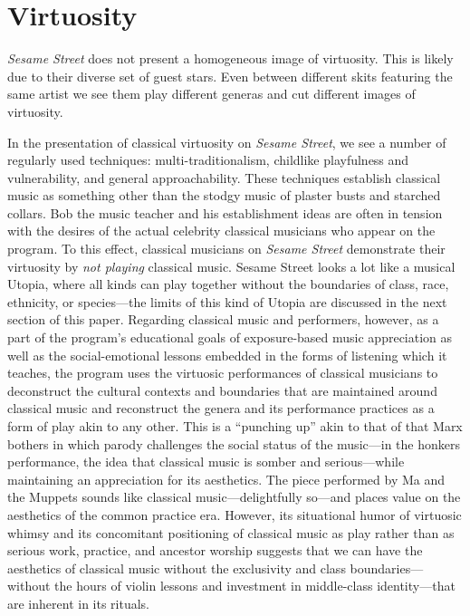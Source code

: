 \documentclass[12pt,letterpaper]{article}
\newcommand{\ses}{\textit{Sesame Street }}
\begin{document}
	\section*{Virtuosity}

	\textit{Sesame Street} does not present a homogeneous image of 
	virtuosity. This 
	is likely due to their diverse set of guest stars. Even between 
	different skits featuring the same artist we see them play different 
	generas and cut different images of virtuosity.

	In the presentation of classical virtuosity on \textit{Sesame Street},
	we see a number
	of regularly used techniques: multi-traditionalism, childlike 
	playfulness and vulnerability, and general approachability. These 
	techniques establish classical music as something other than the stodgy 
	music of plaster busts and starched collars. Bob the music teacher and 
	his establishment ideas are often in tension with the desires of the 
	actual celebrity classical musicians who appear on the program. 
	To this effect, classical musicians on \ses demonstrate their 
	virtuosity by \textit{not playing} classical music. Sesame
	Street looks a lot like a musical Utopia, where all kinds can play 
	together without the boundaries of class, race, ethnicity, or 
	species---the limits of this kind of Utopia are discussed in the next 
	section of this paper. Regarding classical music and performers,
	however, as a part of the program's educational goals of exposure-based
	music appreciation as well as the social-emotional lessons embedded 
	in the forms of listening which it teaches, the program uses the 
	virtuosic performances of classical musicians to deconstruct the
	cultural contexts and boundaries that are maintained around classical
	music and reconstruct the genera and its performance practices as a 
	form of play akin to any other. This is a ``punching up'' akin to that 
	of that Marx bothers in which parody challenges the social status of
	the music---in the honkers performance, the idea that classical music
	is somber and serious---while maintaining an appreciation for its 
	aesthetics. The piece performed by Ma and the Muppets sounds like
	classical music---delightfully so---and places value on the aesthetics 
	of the common practice era. However, its situational humor of virtuosic
	whimsy and its concomitant positioning of classical music as play
	rather than as serious work, practice, and ancestor worship suggests 
	that we can have the aesthetics of classical music 
	without the exclusivity and class boundaries---without the hours of 
	violin lessons and investment in middle-class identity---that are 
	inherent in its rituals. 
\end{document}
